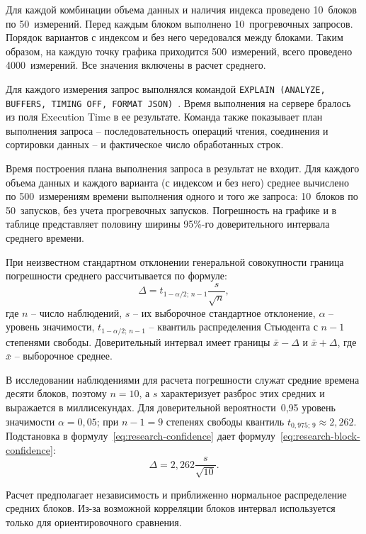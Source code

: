 Для каждой комбинации объема данных и наличия индекса проведено 10~блоков по 50~измерений. Перед каждым блоком выполнено 10~прогревочных запросов. Порядок вариантов с индексом и без него чередовался между блоками. Таким образом, на каждую точку графика приходится 500~измерений, всего проведено 4000~измерений. Все значения включены в расчет среднего.

Для каждого измерения запрос выполнялся командой \texttt{EXPLAIN (ANALYZE, BUFFERS, TIMING OFF, FORMAT JSON)}~\cite{postgresql-explain}. Время выполнения на сервере бралось из поля Execution Time в ее результате. Команда также показывает план выполнения запроса -- последовательность операций чтения, соединения и сортировки данных -- и фактическое число обработанных строк.

Время построения плана выполнения запроса в результат не входит. Для каждого объема данных и каждого варианта (с индексом и без него) среднее вычислено по 500~измерениям времени выполнения одного и того же запроса: 10~блоков по 50~запусков, без учета прогревочных запусков. Погрешность на графике и в таблице представляет половину ширины 95\%-го доверительного интервала среднего времени.

При неизвестном стандартном отклонении генеральной совокупности граница погрешности среднего рассчитывается по формуле:
\begin{equation}
    \Delta = t_{1-\alpha/2;\,n-1}\frac{s}{\sqrt{n}},
    \label{eq:research-confidence}
\end{equation}
где $n$ -- число наблюдений, $s$ -- их выборочное стандартное отклонение, $\alpha$ -- уровень значимости, $t_{1-\alpha/2;\,n-1}$ -- квантиль распределения Стьюдента с $n-1$ степенями свободы. Доверительный интервал имеет границы $\bar{x}-\Delta$ и $\bar{x}+\Delta$, где $\bar{x}$ -- выборочное среднее.

В исследовании наблюдениями для расчета погрешности служат средние времена десяти блоков, поэтому $n=10$, а $s$ характеризует разброс этих средних и выражается в миллисекундах. Для доверительной вероятности~0,95 уровень значимости $\alpha=0{,}05$; при $n-1=9$ степенях свободы квантиль $t_{0{,}975;\,9}\approx2{,}262$. Подстановка в формулу~\eqref{eq:research-confidence} дает формулу~\eqref{eq:research-block-confidence}:
\begin{equation}
    \Delta = 2{,}262\frac{s}{\sqrt{10}}.
    \label{eq:research-block-confidence}
\end{equation}

Расчет предполагает независимость и приближенно нормальное распределение средних блоков. Из-за возможной корреляции блоков интервал используется только для ориентировочного сравнения.

